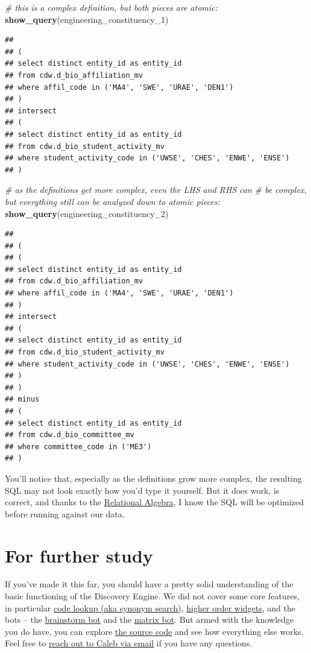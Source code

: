 \documentclass[]{book}
\newenvironment{Shaded}{\begin{snugshade}}{\end{snugshade}}
\newcommand{\CommentTok}[1]{\textcolor[rgb]{0.56,0.35,0.01}{\textit{#1}}}
\newcommand{\DecValTok}[1]{\textcolor[rgb]{0.00,0.00,0.81}{#1}}
\newcommand{\KeywordTok}[1]{\textcolor[rgb]{0.13,0.29,0.53}{\textbf{#1}}}
\newcommand{\NormalTok}[1]{#1}
\begin{document}
\begin{Shaded}
\begin{Highlighting}[]
\CommentTok{# this is a complex definition, but both pieces are atomic:}
\KeywordTok{show_query}\NormalTok{(engineering_constituency_}\DecValTok{1}\NormalTok{)}
\end{Highlighting}
\end{Shaded}

\begin{verbatim}
## 
## (
## select distinct entity_id as entity_id
## from cdw.d_bio_affiliation_mv
## where affil_code in ('MA4', 'SWE', 'URAE', 'DEN1')
## )
## intersect
## (
## select distinct entity_id as entity_id
## from cdw.d_bio_student_activity_mv
## where student_activity_code in ('UWSE', 'CHES', 'ENWE', 'ENSE')
## )
\end{verbatim}

\begin{Shaded}
\begin{Highlighting}[]
\CommentTok{# as the definitions get more complex, even the LHS and RHS can }
\CommentTok{# be complex, but everything still can be analyzed down to atomic pieces:}
\KeywordTok{show_query}\NormalTok{(engineering_constituency_}\DecValTok{2}\NormalTok{)}
\end{Highlighting}
\end{Shaded}

\begin{verbatim}
## 
## (
## (
## select distinct entity_id as entity_id
## from cdw.d_bio_affiliation_mv
## where affil_code in ('MA4', 'SWE', 'URAE', 'DEN1')
## )
## intersect
## (
## select distinct entity_id as entity_id
## from cdw.d_bio_student_activity_mv
## where student_activity_code in ('UWSE', 'CHES', 'ENWE', 'ENSE')
## )
## )
## minus
## (
## select distinct entity_id as entity_id
## from cdw.d_bio_committee_mv
## where committee_code in ('ME3')
## )
\end{verbatim}

You'll notice that, especially as the definitions grow more complex, the resulting SQL may not look exactly how you'd type it yourself. But it does work, is correct, and thanks to the \href{https://en.wikipedia.org/wiki/Relational_algebra}{Relational Algebra}, I know the SQL will be optimized before running against our data.

\hypertarget{for-further-study}{%
\section{For further study}\label{for-further-study}}

If you've made it this far, you should have a pretty solid understanding of the basic functioning of the Discovery Engine. We did not cover some core features, in particular \protect\hyperlink{synonym-search}{code lookup (aka synonym search)}, \protect\hyperlink{higher-order-widgets}{higher order widgets}, and the bots --
the \protect\hyperlink{brainstorm-bot}{brainstorm bot} and the \protect\hyperlink{matrix-bot}{matrix bot}. But armed with the knowledge you do have, you can explore \href{https://github.com/cwolfsonseeley/discoveryengine}{the source code} and see how everything else works. Feel free to \href{mailto:cwolfsonseeley@berkeley.edu}{reach out to Caleb via email} if you have any questions.
\end{document}
